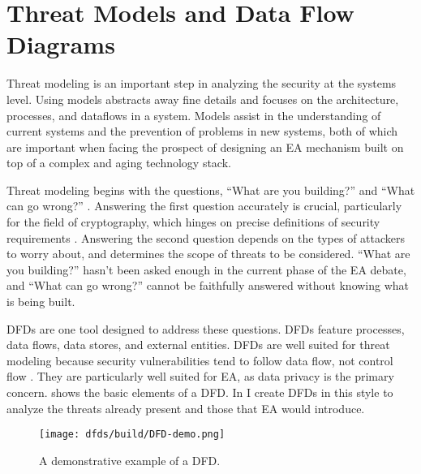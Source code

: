 \section{Threat Models and Data Flow Diagrams}
\label{sec-threat-model-intro}

Threat modeling is an important step in analyzing the security at the systems level. Using models abstracts away fine
details and focuses on the architecture, processes, and dataflows in a system. Models assist in the understanding of
current systems and the prevention of problems in new systems, both of which are important when facing the prospect of
designing an \ac{EA} mechanism built on top of a complex and aging technology stack.

Threat modeling begins with the questions, ``What are you building?'' and ``What can go wrong?''
\cite{shostack_threat_2014}. Answering the first question accurately is crucial, particularly for the field of
cryptography, which hinges on precise definitions of security requirements \cite{varia_2018}. Answering the second
question depends on the types of attackers to worry about, and determines the scope of threats to be considered. ``What
are you building?'' hasn't been asked enough in the current phase of the \ac{EA} debate, and ``What can go wrong?''
cannot be faithfully answered without knowing what is being built.

\Acp{DFD} are one tool designed to address these questions. \Acp{DFD} feature processes, data flows, data stores, and
external entities. \Acp{DFD} are well suited for threat modeling because security vulnerabilities tend to follow data
flow, not control flow \cite{shostack_threat_2014}. They are particularly well suited for \ac{EA}, as data privacy is
the primary concern.  shows the basic elements of a \ac{DFD}. In  I create
\acp{DFD} in this style to analyze the threats already present and those that \ac{EA} would introduce.

\begin{figure}[ht]
    \centering\CaptionFontSize
    \texttt{[image: dfds/build/DFD-demo.png]}
    \caption[\Acs{DFD} Demo]{A demonstrative example of a \acf{DFD}.}
    \label{fig-dfd-demo}
\end{figure}
